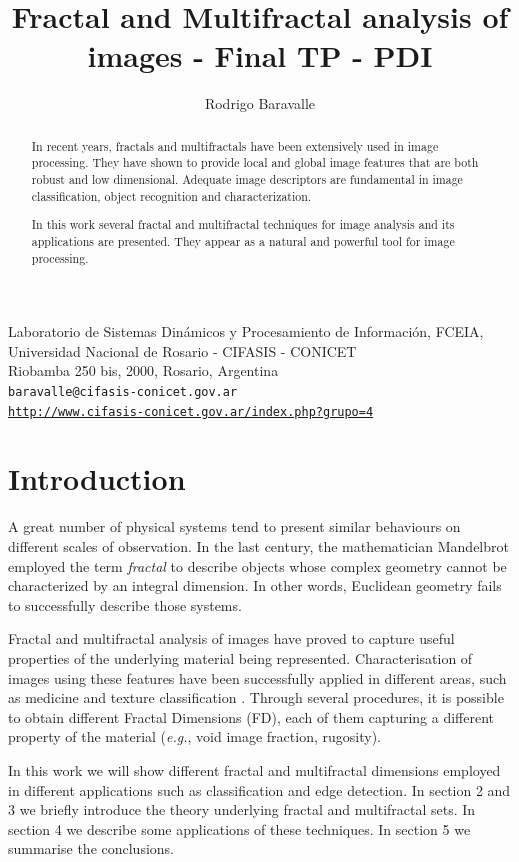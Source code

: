 \documentclass[oneside,a4paper,english,links,12pt]{article}
\title{Fractal and Multifractal analysis of images - Final TP - PDI}
\author{Rodrigo Baravalle}
\begin{document}
\maketitle
\begin{center}
\small{Laboratorio de Sistemas Din\'amicos y Procesamiento de Informaci\'on, FCEIA, Universidad Nacional de Rosario - CIFASIS - CONICET}\\
\small{Riobamba 250 bis, 2000, Rosario, Argentina}\\

\texttt{baravalle@cifasis-conicet.gov.ar}\\
\texttt{\url{http://www.cifasis-conicet.gov.ar/index.php?grupo=4}}
\end{center}

\begin{abstract}
In recent years, fractals and multifractals have been extensively used in image processing. They have shown to provide local and global image features that are both robust and low dimensional. Adequate image descriptors are fundamental in image classification, object recognition and characterization.

In this work several fractal and multifractal techniques for image analysis and its applications are presented. They appear as a natural and powerful tool for image processing.
\end{abstract}

\section{Introduction}
A great number of physical systems tend to present similar behaviours on different scales of observation. In the last century, the mathematician Mandelbrot employed the term {\em fractal} to describe objects whose complex geometry cannot be characterized by an integral dimension. In other words, Euclidean geometry fails to successfully describe those systems.

Fractal and multifractal analysis of images have proved to capture useful properties of the underlying material being represented. Characterisation of images using these features have been successfully applied in different areas, such as medicine \cite{Andjelkovic2008,Yu2011} and texture classification \cite{Wendt2009}. Through several procedures, it is possible to obtain different Fractal Dimensions (FD), each of them capturing a different property of the material ({\em e.g.}, void image fraction, rugosity).

In this work we will show different fractal and multifractal dimensions employed in different applications such as classification and edge detection. In section 2 and 3 we briefly introduce the theory underlying fractal and multifractal sets. In section 4 we describe some applications of these techniques. In section 5 we summarise the conclusions.
\end{document}
